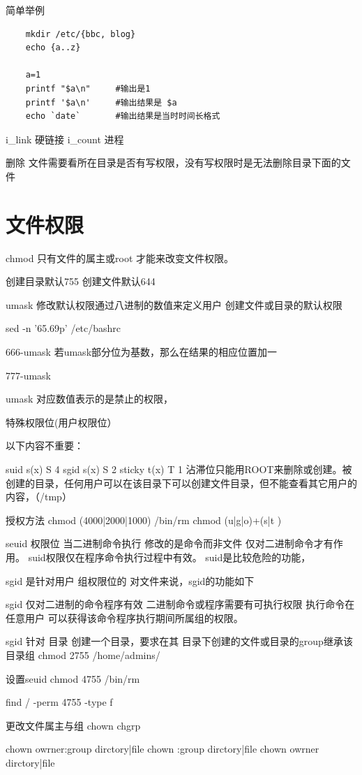 简单举例
\begin{lstlisting}
	mkdir /etc/{bbc, blog}
	echo {a..z}

	a=1
	printf "$a\n"     #输出是1
	printf '$a\n'     #输出结果是 $a
	echo `date`       #输出结果是当时时间长格式
\end{lstlisting}

i_link 硬链接
i_count 进程


删除 文件需要看所在目录是否有写权限，没有写权限时是无法删除目录下面的文件

\section{文件权限}
chmod  只有文件的属主或root 才能来改变文件权限。

创建目录默认755
创建文件默认644

umask  修改默认权限通过八进制的数值来定义用户 创建文件或目录的默认权限

sed -n '65.69p' /etc/bashrc

666-umask
若umask部分位为基数，那么在结果的相应位置加一

777-umask

umask 对应数值表示的是禁止的权限，


特殊权限位(用户权限位）

以下内容不重要：

suid   s(x)    S 4
sgid   s(x)    S 2
sticky t(x)    T 1  沾滞位只能用ROOT来删除或创建。被创建的目录，任何用户可以在该目录下可以创建文件目录，但不能查看其它用户的内容，（/tmp）

授权方法 chmod (4000|2000|1000) /bin/rm  chmod (u|g|o)+(s|t )


seuid  权限位
当二进制命令执行
修改的是命令而非文件
仅对二进制命令才有作用。
suid权限仅在程序命令执行过程中有效。
suid是比较危险的功能，

sgid 是针对用户 组权限位的
对文件来说，sgid的功能如下

sgid 仅对二进制的命令程序有效
二进制命令或程序需要有可执行权限
执行命令在任意用户 可以获得该命令程序执行期间所属组的权限。

sgid 针对 目录
创建一个目录，要求在其 目录下创建的文件或目录的group继承该目录组
chmod 2755 /home/admins/


设置seuid
chmod 4755 /bin/rm

find / -perm 4755 -type f



更改文件属主与组 chown  chgrp


chown owrner:group   dirctory|file
chown :group       dirctory|file
chown owrner       dirctory|file

